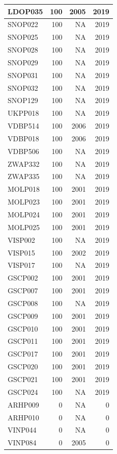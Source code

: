 \documentclass[11pt,]{book}
\begin{document}
\begin{table}
\begin{tabular}[t]{l|r|r|r}
\hline
LDOP035 & 100 & 2005 & 2019\\
\hline
SNOP022 & 100 & NA & 2019\\
\hline
SNOP025 & 100 & NA & 2019\\
\hline
SNOP028 & 100 & NA & 2019\\
\hline
SNOP029 & 100 & NA & 2019\\
\hline
SNOP031 & 100 & NA & 2019\\
\hline
SNOP032 & 100 & NA & 2019\\
\hline
SNOP129 & 100 & NA & 2019\\
\hline
UKPP018 & 100 & NA & 2019\\
\hline
VDBP514 & 100 & 2006 & 2019\\
\hline
VDBP018 & 100 & 2006 & 2019\\
\hline
VDBP506 & 100 & NA & 2019\\
\hline
ZWAP332 & 100 & NA & 2019\\
\hline
ZWAP335 & 100 & NA & 2019\\
\hline
MOLP018 & 100 & 2001 & 2019\\
\hline
MOLP023 & 100 & 2001 & 2019\\
\hline
MOLP024 & 100 & 2001 & 2019\\
\hline
MOLP025 & 100 & 2001 & 2019\\
\hline
VISP002 & 100 & NA & 2019\\
\hline
VISP015 & 100 & 2002 & 2019\\
\hline
VISP017 & 100 & NA & 2019\\
\hline
GSCP002 & 100 & 2001 & 2019\\
\hline
GSCP007 & 100 & 2001 & 2019\\
\hline
GSCP008 & 100 & NA & 2019\\
\hline
GSCP009 & 100 & 2001 & 2019\\
\hline
GSCP010 & 100 & 2001 & 2019\\
\hline
GSCP011 & 100 & 2001 & 2019\\
\hline
GSCP017 & 100 & 2001 & 2019\\
\hline
GSCP020 & 100 & 2001 & 2019\\
\hline
GSCP021 & 100 & 2001 & 2019\\
\hline
GSCP024 & 100 & NA & 2019\\
\hline
ARHP009 & 0 & NA & 0\\
\hline
ARHP010 & 0 & NA & 0\\
\hline
VINP044 & 0 & NA & 0\\
\hline
VINP084 & 0 & 2005 & 0\\

\end{tabular}
\end{table}
\end{document}
